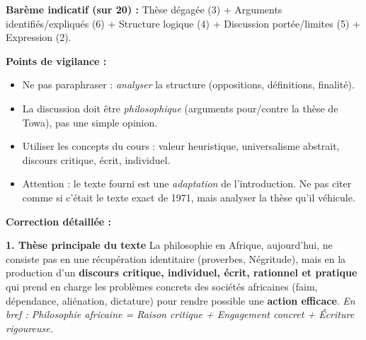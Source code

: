 \documentclass[11pt]{article}
\newcommand{\cle}[1]{{\popxbold\color{popdark}#1}}
\begin{document}
\begin{corrige}
\textbf{Barème indicatif (sur 20) :} Thèse dégagée (3) + Arguments identifiés/expliqués (6) + Structure logique (4) + Discussion portée/limites (5) + Expression (2).

\textbf{Points de vigilance :}
\begin{itemize}
\item Ne pas paraphraser : \emph{analyser} la structure (oppositions, définitions, finalité).
\item La discussion doit être \emph{philosophique} (arguments pour/contre la thèse de Towa), pas une simple opinion.
\item Utiliser les concepts du cours : \cle{valeur heuristique}, \cle{universalisme abstrait}, \cle{discours critique}, \cle{écrit}, \cle{individuel}.
\item Attention : le texte fourni est une \emph{adaptation} de l'introduction. Ne pas citer comme si c'était le texte exact de 1971, mais analyser la thèse qu'il véhicule.
\end{itemize}

\textbf{Correction détaillée :}

\textbf{1. Thèse principale du texte}
La philosophie en Afrique, aujourd'hui, ne consiste pas en une récupération identitaire (proverbes, Négritude), mais en la production d'un \textbf{discours critique, individuel, écrit, rationnel et pratique} qui prend en charge les problèmes concrets des sociétés africaines (faim, dépendance, aliénation, dictature) pour rendre possible une \textbf{action efficace}. \textit{En bref : Philosophie africaine = Raison critique + Engagement concret + Écriture rigoureuse.}


\end{corrige}
\end{document}

